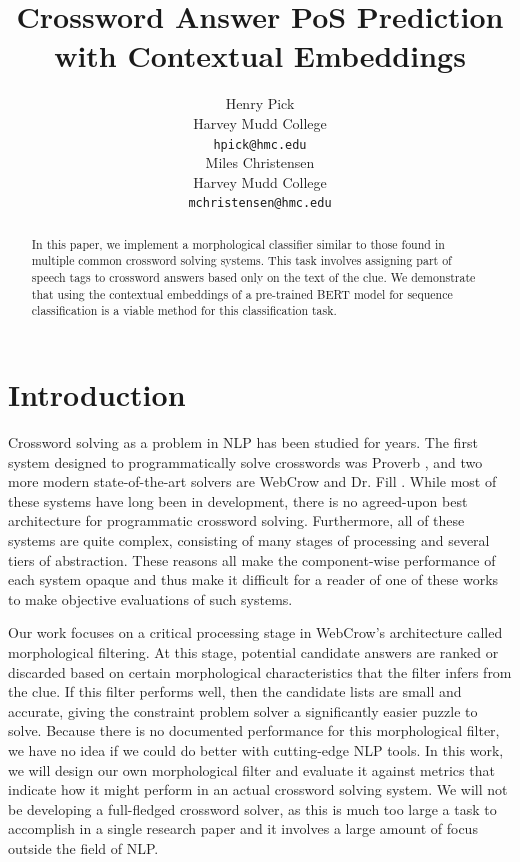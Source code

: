 \documentclass[11pt]{article}
\title{Crossword Answer PoS Prediction with Contextual Embeddings}
\author{
  Henry Pick \\
  Harvey Mudd College \\
  \texttt{hpick@hmc.edu} \\\And
  Miles Christensen \\
  Harvey Mudd College \\
  \texttt{mchristensen@hmc.edu}
 }
\begin{document}
\maketitle

\begin{abstract}
    In this paper, we implement a morphological classifier similar to those found in multiple common crossword solving systems. This task involves assigning part of speech tags to crossword answers based only on the text of the clue. We demonstrate that using the contextual embeddings of a pre-trained BERT model for sequence classification is a viable method for this classification task.
\end{abstract}

\section{Introduction}
Crossword solving as a problem in NLP has been studied for years. The first system designed to programmatically solve crosswords was Proverb \cite{Keim99-PROVERB, Littman02-AProbabilistic}, and two more modern state-of-the-art solvers are WebCrow \cite{Angelini05-Webcrow} and Dr. Fill \cite{Ginsberg11-DrFill}. While most of these systems have long been in development, there is no agreed-upon best architecture for programmatic crossword solving. Furthermore, all of these systems are quite complex, consisting of many stages of processing and several tiers of abstraction. These reasons all make the component-wise performance of each system opaque and thus make it difficult for a reader of one of these works to make objective evaluations of such systems.

Our work focuses on a critical processing stage in WebCrow's architecture called morphological filtering. At this stage, potential candidate answers are ranked or discarded based on certain morphological characteristics that the filter infers from the clue. If this filter performs well, then the candidate lists are small and accurate, giving the constraint problem solver a significantly easier puzzle to solve. Because there is no documented performance for this morphological filter, we have no idea if we could do better with cutting-edge NLP tools. In this work, we will design our own morphological filter and evaluate it against metrics that indicate how it might perform in an actual crossword solving system. We will not be developing a full-fledged crossword solver, as this is much too large a task to accomplish in a single research paper and it involves a large amount of focus outside the field of NLP.
\end{document}
